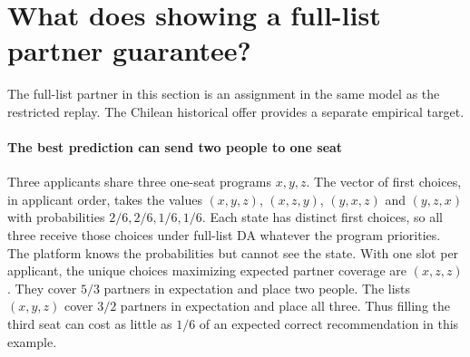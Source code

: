 \section{What does showing a full-list partner guarantee?}\label{sec:two-theory}

The full-list partner in this section is an assignment in the same model as the restricted replay. The Chilean historical offer provides a separate empirical target.

\paragraph{The best prediction can send two people to one seat}
Three applicants share three one-seat programs $x,y,z$. The vector of first choices, in applicant order, takes the values $(x,y,z)$, $(x,z,y)$, $(y,x,z)$ and $(y,z,x)$ with probabilities $2/6,2/6,1/6,1/6$. Each state has distinct first choices, so all three receive those choices under full-list DA whatever the program priorities. The platform knows the probabilities but cannot see the state. With one slot per applicant, the unique choices maximizing expected partner coverage are $(x,z,z)$. They cover $5/3$ partners in expectation and place two people. The lists $(x,y,z)$ cover $3/2$ partners in expectation and place all three. Thus filling the third seat can cost as little as $1/6$ of an expected correct recommendation in this example.

